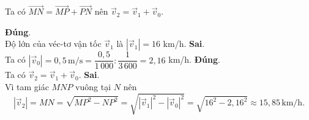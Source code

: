\begin{ex}
{		Ta có $\overrightarrow{MN} =\overrightarrow{MP} +\overrightarrow{PN}$ nên $\overrightarrow{v}_2 =\overrightarrow{v}_1 + \overrightarrow{v}_0$.
		\begin{itemchoice}
			\itemch \textbf{Đúng}.\\
			Độ lớn của véc-tơ vận tốc $\overrightarrow{v}_1$ là $\left|\overrightarrow{v}_1\right|=16$ km/h.
			\itemch \textbf{Sai}.\\
			Ta có $\left|\overrightarrow{v}_0\right|=0{,}5\, \mathrm{m/s} = \dfrac{0{,}5}{1\,000}: \dfrac{1}{3\,600} = 2{,}16$ km/h.
			\itemch \textbf{Đúng}.\\
			Ta có $\overrightarrow{v}_2 =\overrightarrow{v}_1 +\overrightarrow{v}_0$.
			\itemch \textbf{Sai}.\\
			Vì tam giác $MNP$ vuông tại $N$ nên
			$$\left|\overrightarrow{v}_2\right| = MN = \sqrt{MP^2-NP^2} = \sqrt{\left|\overrightarrow{v}_1\right|^2 - \left|\overrightarrow{v}_0\right|^2} = \sqrt{16^2-2{,}16^2} \approx 15{,}85\, \mathrm{km/h}.$$
		\end{itemchoice}
	}
\end{ex}

